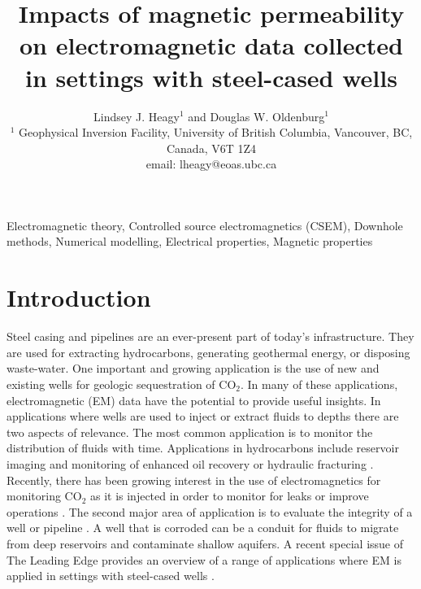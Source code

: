 \documentclass[onecolumn, extra, mreferee]{gji}
\title[EM with conductive, permeable wells]{
  Impacts of magnetic permeability on electromagnetic data collected in settings with steel-cased wells
}
\author[L. J. Heagy and D. W. Oldenburg]{
  Lindsey J. Heagy$^1$ and Douglas W. Oldenburg$^1$\\
  $^1$ Geophysical Inversion Facility, University of British Columbia, Vancouver, BC, Canada, V6T 1Z4
  \\ \quad email: lheagy@eoas.ubc.ca
}
\begin{document}
\label{firstpage}

\maketitle

\begin{abstract}

\end{abstract}

\begin{keywords}
Electromagnetic theory, Controlled source electromagnetics (CSEM), Downhole methods, Numerical modelling, Electrical properties, Magnetic properties
\end{keywords}


\section{Introduction}

Steel casing and pipelines are an ever-present part of today's infrastructure. They are used for extracting hydrocarbons, generating geothermal energy, or disposing waste-water. One important and growing application is the use of new and existing wells for geologic sequestration of CO$_2$. In many of these applications, electromagnetic (EM) data have the potential to provide useful insights. In applications where wells are used to inject or extract fluids to depths there are two aspects of relevance. The most common application is to monitor the distribution of fluids with time. Applications in hydrocarbons include reservoir imaging and monitoring of enhanced oil recovery or hydraulic fracturing \citep{Rocroi1985, Pardo2008a, tang_three-dimensional_2015, hoversten_hydro-frac_2015, Tietze2015}. Recently, there has been growing interest in the use of electromagnetics for monitoring CO$_2$ as it is injected in order to monitor for leaks or improve operations \citep{carrigan_electrical_2013, park_25d_2017, puzyrev_three-dimensional_2017, um_joint_2020}. The second major area of application is to evaluate the integrity of a well or pipeline \cite{wilt_casing_2020, beskardes_effects_2021}. A well that is corroded can be a conduit for fluids to migrate from deep reservoirs and contaminate shallow aquifers. A recent special issue of The Leading Edge provides an overview of a range of applications where EM is applied in settings with steel-cased wells \citep{weiss_introduction_2022}.
\end{document}
